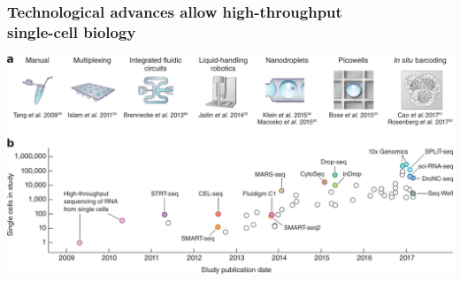 \documentclass[usepdftitle=false, compress]{beamer}
\begin{document}
\begin{frame}
	\frametitle{Technological advances allow high-throughput\\single-cell biology}
	\begin{center}
		\includegraphics[width=\linewidth]{figures/2_part_scaling.pdf}\\
	\end{center}
  \vspace*{-2.2em}
\end{frame}
\end{document}
